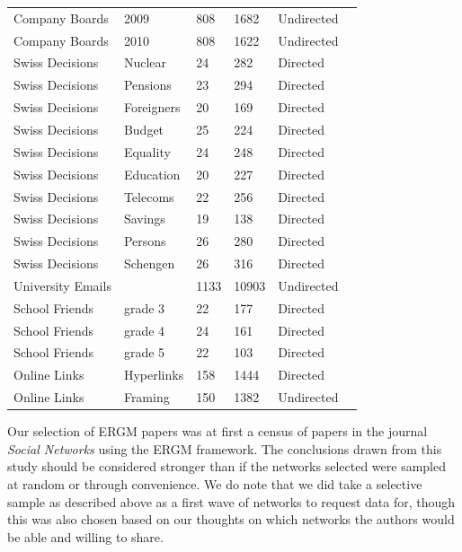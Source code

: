 \documentclass[
]{statsoc}
\begin{document}
\begin{table}
\begin{tabular}[t]{lllllr}
\rowcolor{gray!6}  Company Boards & 2009 & 808 & 1682 & Undirected & \cite{Gygax2015}\\
Company Boards & 2010 & 808 & 1622 & Undirected & \cite{Gygax2015}\\
\addlinespace
\rowcolor{gray!6}  Swiss Decisions & Nuclear & 24 & 282 & Directed & \cite{Fischer2015}\\
Swiss Decisions & Pensions & 23 & 294 & Directed & \cite{Fischer2015}\\
\rowcolor{gray!6}  Swiss Decisions & Foreigners & 20 & 169 & Directed & \cite{Fischer2015}\\
Swiss Decisions & Budget & 25 & 224 & Directed & \cite{Fischer2015}\\
\rowcolor{gray!6}  Swiss Decisions & Equality & 24 & 248 & Directed & \cite{Fischer2015}\\
Swiss Decisions & Education & 20 & 227 & Directed & \cite{Fischer2015}\\
\rowcolor{gray!6}  Swiss Decisions & Telecoms & 22 & 256 & Directed & \cite{Fischer2015}\\
Swiss Decisions & Savings & 19 & 138 & Directed & \cite{Fischer2015}\\
\rowcolor{gray!6}  Swiss Decisions & Persons & 26 & 280 & Directed & \cite{Fischer2015}\\
Swiss Decisions & Schengen & 26 & 316 & Directed & \cite{Fischer2015}\\
\addlinespace
\rowcolor{gray!6}  University Emails &  & 1133 & 10903 & Undirected & \cite{Toivonen2009}\\
\addlinespace
School Friends & grade 3 & 22 & 177 & Directed & \cite{Anderson1999}\\
\rowcolor{gray!6}  School Friends & grade 4 & 24 & 161 & Directed & \cite{Anderson1999}\\
School Friends & grade 5 & 22 & 103 & Directed & \cite{Anderson1999}\\
\addlinespace
\rowcolor{gray!6}  Online Links & Hyperlinks & 158 & 1444 & Directed & \cite{Ackland2011}\\
Online Links & Framing & 150 & 1382 & Undirected & \cite{Ackland2011}\\
\bottomrule
\end{tabular}
\end{table}

Our selection of ERGM papers was at first a census of papers in the
journal \textit{Social Networks} using the ERGM framework. The
conclusions drawn from this study should be considered stronger than if
the networks selected were sampled at random or through convenience. We
do note that we did take a selective sample as described above as a
first wave of networks to request data for, though this was also chosen
based on our thoughts on which networks the authors would be able and
willing to share.
\end{document}
